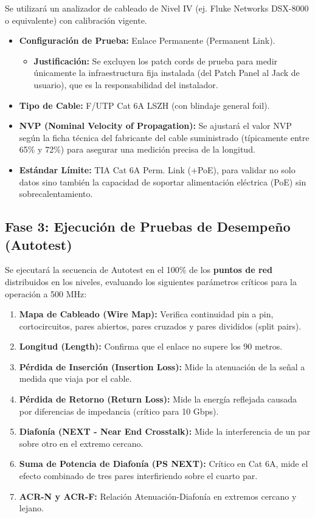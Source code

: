 Se utilizará un analizador de cableado de Nivel IV (ej. Fluke Networks DSX-8000 o equivalente) con calibración vigente.

\begin{itemize}
    \item \textbf{Configuración de Prueba:} Enlace Permanente (Permanent Link).
    \begin{itemize}
        \item \textbf{Justificación:} Se excluyen los patch cords de prueba para medir únicamente la infraestructura fija instalada (del Patch Panel al Jack de usuario), que es la responsabilidad del instalador.
    \end{itemize}
    \item \textbf{Tipo de Cable:} F/UTP Cat 6A LSZH (con blindaje general foil).
    \item \textbf{NVP (Nominal Velocity of Propagation):} Se ajustará el valor NVP según la ficha técnica del fabricante del cable suministrado (típicamente entre 65\% y 72\%) para asegurar una medición precisa de la longitud.
    \item \textbf{Estándar Límite:} TIA Cat 6A Perm. Link (+PoE), para validar no solo datos sino también la capacidad de soportar alimentación eléctrica (PoE) sin sobrecalentamiento.
\end{itemize}

\subsection*{Fase 3: Ejecución de Pruebas de Desempeño (Autotest)}

Se ejecutará la secuencia de Autotest en el 100\% de los \textbf{\totalPuntos{} puntos de red} distribuidos en los \totalPisos{} niveles, evaluando los siguientes parámetros críticos para la operación a 500 MHz:

\begin{enumerate}
    \item \textbf{Mapa de Cableado (Wire Map):} Verifica continuidad pin a pin, cortocircuitos, pares abiertos, pares cruzados y pares divididos (split pairs).
    \item \textbf{Longitud (Length):} Confirma que el enlace no supere los 90 metros.
    \item \textbf{Pérdida de Inserción (Insertion Loss):} Mide la atenuación de la señal a medida que viaja por el cable.
    \item \textbf{Pérdida de Retorno (Return Loss):} Mide la energía reflejada causada por diferencias de impedancia (crítico para 10 Gbps).
    \item \textbf{Diafonía (NEXT - Near End Crosstalk):} Mide la interferencia de un par sobre otro en el extremo cercano.
    \item \textbf{Suma de Potencia de Diafonía (PS NEXT):} Crítico en Cat 6A, mide el efecto combinado de tres pares interfiriendo sobre el cuarto par.
    \item \textbf{ACR-N y ACR-F:} Relación Atenuación-Diafonía en extremos cercano y lejano.
\end{enumerate}

